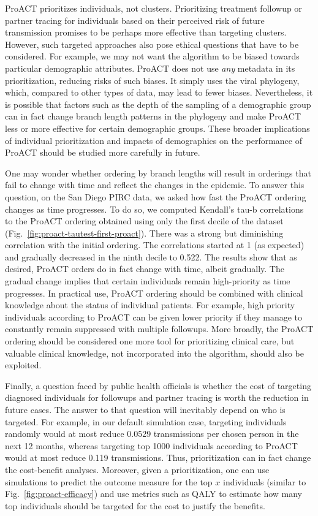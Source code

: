 ProACT prioritizes individuals, not clusters. Prioritizing treatment followup or partner tracing for individuals based on their perceived risk of future transmission promises to be perhaps more effective than targeting clusters. However, such targeted approaches also pose ethical questions that have to be considered. For example, we may not want the algorithm to be biased towards particular demographic attributes. ProACT does not use \textit{any} metadata in its prioritization, reducing risks of such biases. It simply uses the viral phylogeny, which, compared to other types of data, may lead to fewer biases. Nevertheless, it is possible that factors such as the depth of the sampling of a demographic group can in fact change branch length patterns in the phylogeny and make ProACT less or more effective for certain demographic groups. These broader implications of individual prioritization and impacts of demographics on the performance of ProACT should be studied more carefully in future.

One may wonder whether ordering by branch lengths will result in orderings that fail to change with time and reflect the changes in the epidemic. To answer this question, on the San Diego \gls{PIRC} data, we asked how fast the ProACT ordering changes as time progresses. To do so, we computed Kendall's tau-b correlations to the ProACT ordering obtained using only the first decile of the dataset (Fig.~\ref{fig:proact-tautest-first-proact}). There was a strong but diminishing correlation with the initial ordering. The correlations started at 1 (as expected) and gradually decreased in the ninth decile to 0.522. The results show that as desired, ProACT orders do in fact change with time, albeit gradually. The gradual change implies that certain individuals remain high-priority as time progresses. In practical use, ProACT ordering should be combined with clinical knowledge about the status of individual patients. For example, high priority individuals according to ProACT can be given lower priority if they manage to constantly remain suppressed with multiple followups. More broadly, the ProACT ordering should be considered one more tool for prioritizing clinical care, but valuable clinical knowledge, not incorporated into the algorithm, should also be exploited.

Finally, a question faced by public health officials is whether the cost of targeting diagnosed individuals for followups and partner tracing is worth the reduction in future cases. The answer to that question will inevitably depend on who is targeted. For example, in our default simulation case, targeting individuals randomly would at most reduce 0.0529 transmissions per chosen person in the next 12 months, whereas targeting top 1000 individuals according to ProACT would at most reduce 0.119 transmissions. Thus, prioritization can in fact change the cost-benefit analyses. Moreover, given a prioritization, one can use simulations to predict the outcome measure for the top $x$ individuals (similar to Fig.~\ref{fig:proact-efficacy}) and use metrics such as \gls{QALY} to estimate how many top individuals should be targeted for the cost to justify the benefits.

